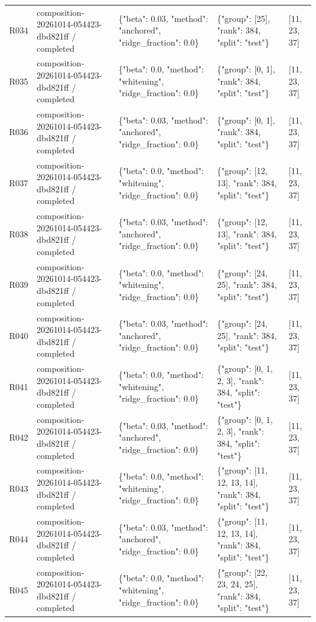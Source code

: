 \documentclass[10pt]{article}
\begin{document}
{\begin{longtable}{p{}p{}p{}p{}p{}}
R034 & composition-20261014-054423-dbd821ff / completed & \{"beta": 0.03, "method": "anchored", "ridge\_fraction": 0.0\} & \{"group": [25], "rank": 384, "split": "test"\} & [11, 23, 37] \\
R035 & composition-20261014-054423-dbd821ff / completed & \{"beta": 0.0, "method": "whitening", "ridge\_fraction": 0.0\} & \{"group": [0, 1], "rank": 384, "split": "test"\} & [11, 23, 37] \\
R036 & composition-20261014-054423-dbd821ff / completed & \{"beta": 0.03, "method": "anchored", "ridge\_fraction": 0.0\} & \{"group": [0, 1], "rank": 384, "split": "test"\} & [11, 23, 37] \\
R037 & composition-20261014-054423-dbd821ff / completed & \{"beta": 0.0, "method": "whitening", "ridge\_fraction": 0.0\} & \{"group": [12, 13], "rank": 384, "split": "test"\} & [11, 23, 37] \\
R038 & composition-20261014-054423-dbd821ff / completed & \{"beta": 0.03, "method": "anchored", "ridge\_fraction": 0.0\} & \{"group": [12, 13], "rank": 384, "split": "test"\} & [11, 23, 37] \\
R039 & composition-20261014-054423-dbd821ff / completed & \{"beta": 0.0, "method": "whitening", "ridge\_fraction": 0.0\} & \{"group": [24, 25], "rank": 384, "split": "test"\} & [11, 23, 37] \\
R040 & composition-20261014-054423-dbd821ff / completed & \{"beta": 0.03, "method": "anchored", "ridge\_fraction": 0.0\} & \{"group": [24, 25], "rank": 384, "split": "test"\} & [11, 23, 37] \\
R041 & composition-20261014-054423-dbd821ff / completed & \{"beta": 0.0, "method": "whitening", "ridge\_fraction": 0.0\} & \{"group": [0, 1, 2, 3], "rank": 384, "split": "test"\} & [11, 23, 37] \\
R042 & composition-20261014-054423-dbd821ff / completed & \{"beta": 0.03, "method": "anchored", "ridge\_fraction": 0.0\} & \{"group": [0, 1, 2, 3], "rank": 384, "split": "test"\} & [11, 23, 37] \\
R043 & composition-20261014-054423-dbd821ff / completed & \{"beta": 0.0, "method": "whitening", "ridge\_fraction": 0.0\} & \{"group": [11, 12, 13, 14], "rank": 384, "split": "test"\} & [11, 23, 37] \\
R044 & composition-20261014-054423-dbd821ff / completed & \{"beta": 0.03, "method": "anchored", "ridge\_fraction": 0.0\} & \{"group": [11, 12, 13, 14], "rank": 384, "split": "test"\} & [11, 23, 37] \\
R045 & composition-20261014-054423-dbd821ff / completed & \{"beta": 0.0, "method": "whitening", "ridge\_fraction": 0.0\} & \{"group": [22, 23, 24, 25], "rank": 384, "split": "test"\} & [11, 23, 37] \\

\end{longtable}}
\end{document}

